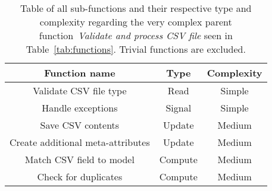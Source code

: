 \begin{table}[h]
    \centering
    \begin{tabular}{ccc}
        \toprule
        \textbf{Function name}
        & \textbf{Type}
        & \textbf{Complexity}
        \\ \midrule
        Validate CSV file type
        & Read
        & Simple
        \\ \midrule
        Handle exceptions
        & Signal
        & Simple
        \\ \midrule
        Save CSV contents
        & Update
        & Medium
        \\ \midrule
        Create additional meta-attributes
        & Update
        & Medium
        \\ \midrule
        Match CSV field to model
        & Compute
        & Medium
        \\ \midrule
        Check for duplicates
        & Compute
        & Medium
        \\ \bottomrule
    \end{tabular}%
    \caption{Table of all sub-functions and their respective type and complexity regarding the very complex parent
    function~\textit{Validate and process CSV file} seen in Table~\ref{tab:functions}.
    Trivial functions are excluded.
    }\label{tab:functions-validate-and-process-csv-file}
\end{table}
